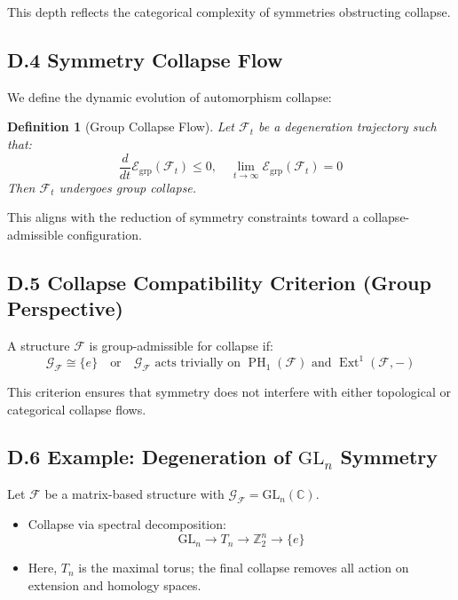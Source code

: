 \documentclass[11pt]{article}
\newtheorem{definition}[theorem]{Definition}
\DeclareMathOperator{\Ext}{Ext}
\DeclareMathOperator{\PH}{PH}
\begin{document}
This depth reflects the categorical complexity of symmetries obstructing collapse.

\subsection*{D.4 Symmetry Collapse Flow}

We define the dynamic evolution of automorphism collapse:

\begin{definition}[Group Collapse Flow]
Let $\mathcal{F}_t$ be a degeneration trajectory such that:
\[
\frac{d}{dt} \mathcal{E}_{\mathrm{grp}}(\mathcal{F}_t) \leq 0, \quad \lim_{t \to \infty} \mathcal{E}_{\mathrm{grp}}(\mathcal{F}_t) = 0
\]
Then $\mathcal{F}_t$ undergoes group collapse.
\end{definition}

This aligns with the reduction of symmetry constraints toward a collapse-admissible configuration.

\subsection*{D.5 Collapse Compatibility Criterion (Group Perspective)}

A structure $\mathcal{F}$ is group-admissible for collapse if:
\[
\mathcal{G}_{\mathcal{F}} \cong \{e\} \quad \text{or} \quad \mathcal{G}_{\mathcal{F}} \text{ acts trivially on } \PH_1(\mathcal{F}) \text{ and } \Ext^1(\mathcal{F}, -)
\]

This criterion ensures that symmetry does not interfere with either topological or categorical collapse flows.

\subsection*{D.6 Example: Degeneration of $\mathrm{GL}_n$ Symmetry}

Let $\mathcal{F}$ be a matrix-based structure with $\mathcal{G}_{\mathcal{F}} = \mathrm{GL}_n(\mathbb{C})$.

\begin{itemize}
    \item Collapse via spectral decomposition:
    \[
    \mathrm{GL}_n \longrightarrow T_n \longrightarrow \mathbb{Z}_2^n \longrightarrow \{e\}
    \]
    \item Here, $T_n$ is the maximal torus; the final collapse removes all action on extension and homology spaces.
\end{itemize}
\end{document}
